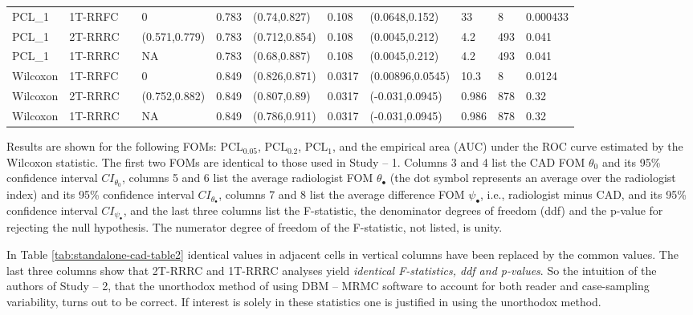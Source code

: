 \documentclass[
]{book}
\begin{document}
\begin{table}
\begin{tabular}[t]{lllllllllll}
\cmidrule{1-11}
PCL\_1 & 1T-RRFC &  & 0 & 0.783 & (0.74,0.827) & 0.108 & (0.0648,0.152) & 33 & 8 & 0.000433\\
\cmidrule{1-2}
\cmidrule{4-11}
PCL\_1 & 2T-RRRC &  & (0.571,0.779) & 0.783 & (0.712,0.854) & 0.108 & (0.0045,0.212) & 4.2 & 493 & 0.041\\
\cmidrule{1-2}
\cmidrule{4-11}
PCL\_1 & 1T-RRRC & \multirow{-3}{*}{\raggedright\arraybackslash 0.675} & NA & 0.783 & (0.68,0.887) & 0.108 & (0.0045,0.212) & 4.2 & 493 & 0.041\\
\cmidrule{1-11}
Wilcoxon & 1T-RRFC &  & 0 & 0.849 & (0.826,0.871) & 0.0317 & (0.00896,0.0545) & 10.3 & 8 & 0.0124\\
\cmidrule{1-2}
\cmidrule{4-11}
Wilcoxon & 2T-RRRC &  & (0.752,0.882) & 0.849 & (0.807,0.89) & 0.0317 & (-0.031,0.0945) & 0.986 & 878 & 0.32\\
\cmidrule{1-2}
\cmidrule{4-11}
Wilcoxon & 1T-RRRC & \multirow{-3}{*}{\raggedright\arraybackslash 0.817} & NA & 0.849 & (0.786,0.911) & 0.0317 & (-0.031,0.0945) & 0.986 & 878 & 0.32\\
\bottomrule
\end{tabular}
\end{table}

Results are shown for the following FOMs: \(\text{PCL}_{0.05}\), \(\text{PCL}_{0.2}\), \(\text{PCL}_{1}\), and the empirical area (AUC) under the ROC curve estimated by the Wilcoxon statistic. The first two FOMs are identical to those used in Study -- 1. Columns 3 and 4 list the CAD FOM \(\theta_0\) and its 95\% confidence interval \(CI_{\theta_0}\), columns 5 and 6 list the average radiologist FOM \(\theta_{\bullet}\) (the dot symbol represents an average over the radiologist index) and its 95\% confidence interval \(CI_{\theta_{\bullet}}\), columns 7 and 8 list the average difference FOM \(\psi_{\bullet}\), i.e., radiologist minus CAD, and its 95\% confidence interval \(CI_{\psi_{\bullet}}\), and the last three columns list the F-statistic, the denominator degrees of freedom (ddf) and the p-value for rejecting the null hypothesis. The numerator degree of freedom of the F-statistic, not listed, is unity.

In Table \ref{tab:standalone-cad-table2} identical values in adjacent cells in vertical columns have been replaced by the common values. The last three columns show that 2T-RRRC and 1T-RRRC analyses yield \emph{identical F-statistics, ddf and p-values}. So the intuition of the authors of Study -- 2, that the unorthodox method of using DBM -- MRMC software to account for both reader and case-sampling variability, turns out to be correct. If interest is solely in these statistics one is justified in using the unorthodox method.
\end{document}
